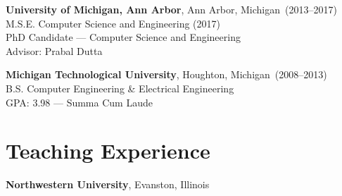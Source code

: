 \documentclass{article}
\begin{document}
{\bf University of Michigan, Ann Arbor}, Ann Arbor, Michigan~(2013--2017) \\
M.S.E. Computer Science and Engineering (2017) \\
PhD Candidate --- Computer Science and Engineering \\
Advisor: Prabal Dutta

{\bf Michigan Technological University}, Houghton, Michigan~(2008--2013) \\
B.S. Computer Engineering \& Electrical Engineering \\
GPA: 3.98 --- Summa Cum Laude


\section*{Teaching Experience}
\vspace{-6pt}
{\bf Northwestern University}, Evanston, Illinois
\vspace{-6pt}
\end{document}
